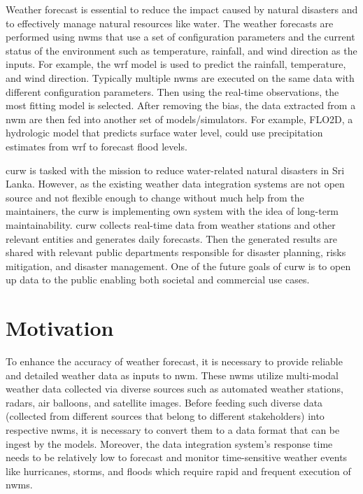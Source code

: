 Weather forecast is essential to reduce the impact caused by natural disasters and to effectively manage natural resources like water.
The weather forecasts are performed using \acrfull{nwms} that use a set of configuration parameters and the current status of the environment such as temperature, rainfall, and wind direction as the inputs. For example, the \acrfull{wrf} \cite{MesoscaleMicroscaleMeteorologyLaboratoryWeatherModel} model is used to predict the rainfall, temperature, and wind direction. Typically multiple \acrshort{nwms} are executed on the same data with different configuration parameters. Then using the real-time observations, the most fitting model is selected. After removing the bias, the data extracted from a \acrshort{nwm} are then fed into another set of models/simulators. For example, FLO2D, a hydrologic model that predicts surface water level, could use precipitation estimates from \acrshort{wrf} to forecast flood levels.

\acrfull{curw} \cite{CUrWSL2017Lanka} is tasked with the mission to reduce water-related natural disasters in Sri Lanka. 
However, as the existing weather data integration systems are not open source and not flexible enough to change without much help from the maintainers, the \acrshort{curw} \cite{CUrWSLObservedSL} is implementing own system with the idea of long-term maintainability.
\acrshort{curw} collects real-time data from weather stations and other relevant entities and generates daily forecasts. Then the generated results are shared with relevant public departments responsible for disaster planning, risks mitigation, and disaster management. One of the future goals of \acrshort{curw} is to open up data to the public enabling both societal and commercial use cases.

\section{Motivation}
To enhance the accuracy of weather forecast, it is necessary to provide reliable and detailed weather data as inputs to \acrshort{nwm}. These \acrshort{nwms} utilize multi-modal weather data collected via diverse sources such as automated weather stations, radars, air balloons, and satellite images. Before feeding such diverse data (collected from different sources that belong to different stakeholders) into respective \acrshort{nwms}, it is necessary to convert them to a data format that can be ingest by the models. Moreover, the data integration system's response time needs to be relatively low to forecast and monitor time-sensitive weather events like hurricanes, storms, and floods which require rapid and frequent execution of \acrshort{nwms}.

